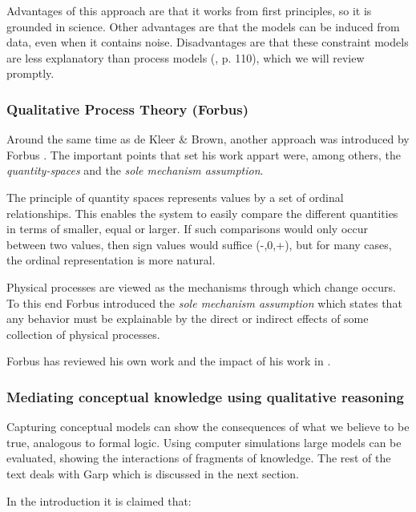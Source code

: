 \documentclass{article} %
\begin{document}
Advantages of this approach are that it works from first principles, so it is
grounded in science. Other advantages are that the models can be induced from
data, even when it contains noise. Disadvantages are that these constraint
models are less explanatory than process models (\cite{forbus}, p. 110), 
which we will review promptly.

\subsubsection{Qualitative Process Theory (Forbus)}
\label{sec:litrev_qr_forbus}
Around the same time as de Kleer \& Brown, another approach was introduced by
Forbus \cite{forbus}. The important points that set his work appart were,
among others, the \emph{quantity-spaces} and the \emph{sole mechanism
assumption}.

The principle of quantity spaces represents values by a set of ordinal
relationships. This enables the system to easily compare the different
quantities in terms of smaller, equal or larger. If such comparisons would
only occur between two values, then sign values would suffice (-,0,+), but for
many cases, the ordinal representation is more natural.

\vspace{0.8em}

Physical processes are viewed as the mechanisms through which change occurs.
To this end Forbus introduced the \emph{sole mechanism assumption} which
states that any behavior must be explainable by the direct or indirect effects
of some collection of physical processes.

\vspace{0.8em}

Forbus has reviewed his own work and the impact of his work in
\cite{forbus12}.

\subsubsection{Mediating conceptual knowledge using qualitative reasoning}

Capturing conceptual models can show the consequences of what we believe to be
true, analogous to formal logic. Using computer simulations large models can
be evaluated, showing the interactions of fragments of knowledge. The rest
of the text\cite{bredeweg-eco} deals with Garp which is discussed in the next
section.

In the introduction it is claimed that:
\end{document}
